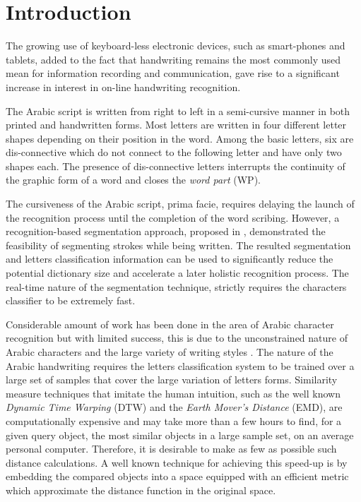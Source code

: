 \documentclass[10pt, conference, compsocconf]{IEEEtran}
\begin{document}
\section{Introduction}
The growing use of keyboard-less electronic devices, such as smart-phones and tablets, added to the fact that handwriting remains the most commonly used mean for information recording and communication, gave rise to a significant increase in interest in on-line handwriting recognition.

The Arabic script is written from right to left in a semi-cursive manner in both printed and handwritten forms. 
Most letters are written in four different letter shapes depending on their position in the word.
Among the basic letters, six are dis-connective which do not connect to the following letter and have only two shapes each. 
The presence of dis-connective letters interrupts the continuity of the graphic form of a word and closes the \emph{word part} (WP).

The cursiveness of the Arabic script, prima facie, requires delaying the launch of the recognition process until the completion of the word scribing.
However, a recognition-based segmentation approach, proposed in \cite{kour2014real}, demonstrated the feasibility of segmenting strokes while being written.
The resulted segmentation and letters classification information can be used to significantly reduce the potential dictionary size and accelerate a later holistic recognition process.
The real-time nature of the segmentation technique, strictly requires the characters classifier to be extremely fast.

Considerable amount of work has been done in the area of Arabic character recognition but with limited success, this is due to the unconstrained nature of Arabic characters and the large variety of writing styles \cite{al2010recognition}.
The nature of the Arabic handwriting requires the letters classification system to be trained over a large set of samples that cover the large variation of letters forms.
Similarity measure techniques that imitate the human intuition, such as the well known \emph{Dynamic Time Warping} (DTW) and the \emph{Earth Mover's Distance} (EMD), are computationally expensive and may take more than a few hours to find, for a given query object, the most similar objects in a large sample set, on an average personal computer.
Therefore, it is desirable to make as few as possible such distance calculations.
A well known technique for achieving this speed-up is by embedding the compared objects into a space equipped with an efficient metric which approximate the distance function in the original space.
\end{document}
